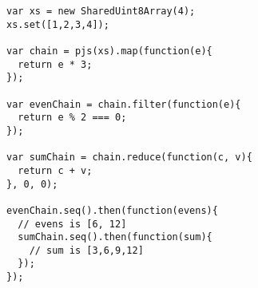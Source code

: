 \begin{lstlisting}[caption=Example creating multiple chains from the same base chain]
var xs = new SharedUint8Array(4);
xs.set([1,2,3,4]);

var chain = pjs(xs).map(function(e){
  return e * 3;
});

var evenChain = chain.filter(function(e){
  return e % 2 === 0;
});

var sumChain = chain.reduce(function(c, v){
  return c + v;
}, 0, 0);

evenChain.seq().then(function(evens){
  // evens is [6, 12]
  sumChain.seq().then(function(sum){
    // sum is [3,6,9,12]
  });
});
\end{lstlisting}

\pagebreak